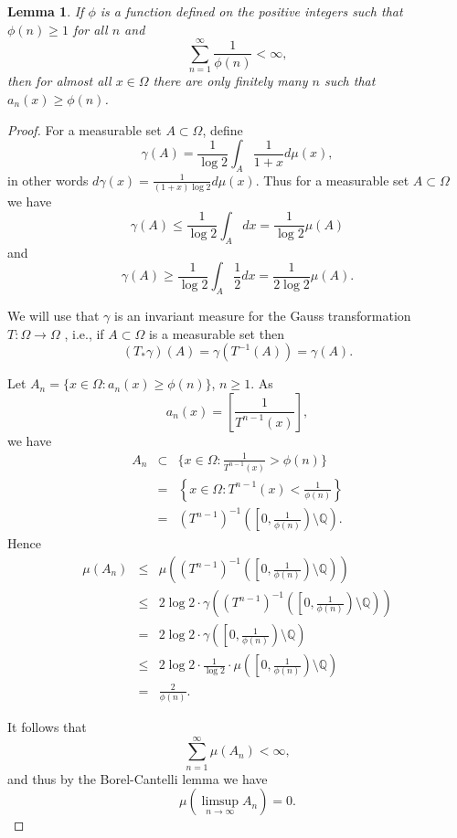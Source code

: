 \documentclass{amsart}
\newtheorem{lemma}[theorem]{Lemma}
\begin{document}
\begin{lemma}
If $\phi$ is a function defined on the positive integers such that $\phi(n) \geq 1$ for all $n$ and 
\[
\sum_{n=1}^\infty \frac{1}{\phi(n)}<\infty,
\]
then for almost all $x \in \Omega$ there are only finitely many $n$ such that $a_n(x) \geq \phi(n)$.
\label{partialquotients}
\end{lemma}
\begin{proof}
For a measurable set $A \subset \Omega$, define
\[
\gamma(A)=\frac{1}{\log 2}\int_A \frac{1}{1+x} d\mu(x),
\]
in other words $d\gamma(x) = \frac{1}{(1+x)\log 2} d\mu(x)$.
Thus for a measurable set $A \subset \Omega$ we have
\[
\gamma(A) \leq \frac{1}{\log 2}\int_A dx = \frac{1}{\log 2}\mu(A)
\]
and
\[
\gamma(A) \geq \frac{1}{\log 2}\int_A \frac{1}{2}dx=\frac{1}{2\log 2}\mu(A).
\]

We will use that $\gamma$ is an invariant measure for the Gauss transformation $T:\Omega \to \Omega$  \cite[p.~77, Lemma 3.5]{einsiedler}, i.e., if $A \subset \Omega$ is a measurable set
then
\[
(T_*\gamma)(A) = \gamma(T^{-1}(A))=\gamma(A).
\]

Let $A_n=\{x \in \Omega: a_n(x) \geq \phi(n)\}$, $n \geq 1$. 
As 
\[
a_n(x)=\left[ \frac{1}{T^{n-1}(x)} \right],
\]
we have
\begin{eqnarray*}
A_n&\subset&\{x \in \Omega: \frac{1}{T^{n-1}(x)} > \phi(n) \}\\
&=&\left\{x \in \Omega: T^{n-1}(x) < \frac{1}{\phi(n)} \right\}\\
&=&(T^{n-1})^{-1}\left( \left[0,\frac{1}{\phi(n)}\right) \setminus \mathbb{Q} \right).
\end{eqnarray*}
Hence
\begin{eqnarray*}
\mu(A_n)&\leq&\mu\left((T^{n-1})^{-1}\left( \left[0,\frac{1}{\phi(n)}\right) \setminus \mathbb{Q} \right)\right)\\
&\leq& 2\log 2 \cdot \gamma\left((T^{n-1})^{-1}\left( \left[0,\frac{1}{\phi(n)}\right) \setminus \mathbb{Q} \right)\right)\\
&=&2\log 2 \cdot \gamma \left( \left[0,\frac{1}{\phi(n)}\right) \setminus \mathbb{Q} \right)\\
&\leq&2 \log 2 \cdot \frac{1}{\log 2} \cdot \mu \left( \left[0,\frac{1}{\phi(n)}\right) \setminus \mathbb{Q} \right)\\
&=&\frac{2}{\phi(n)}.
\end{eqnarray*}

It follows that 
\[
\sum_{n=1}^\infty \mu(A_n)<\infty,
\]
and thus by the Borel-Cantelli lemma \cite[p.~59, Theorem 4.3]{billingsley} we have
\[
\mu(\limsup_{n \to \infty} A_n)=0.
\]
\end{proof}
\end{document}
